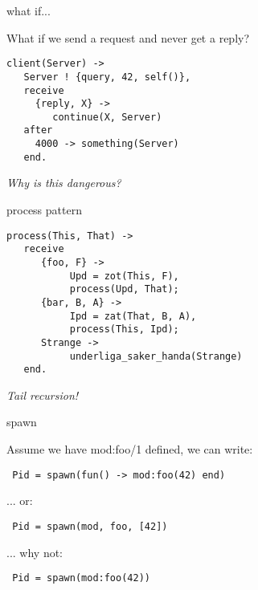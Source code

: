 \begin{frame}[fragile]{what if...}

What if we send a request and never get a reply?

\pause\vspace{20pt}
\begin{verbatim}
client(Server) ->
   Server ! {query, 42, self()},
   receive 
     {reply, X} ->
        continue(X, Server)
   after 
     4000 -> something(Server)
   end.
\end{verbatim}

\pause\vspace{20pt}
{\em Why is this dangerous?}
\end{frame}



\begin{frame}[fragile]{process pattern}

\begin{verbatim}
process(This, That) ->
   receive
      {foo, F} -> 
           Upd = zot(This, F),
           process(Upd, That);
      {bar, B, A} ->
           Ipd = zat(That, B, A),
           process(This, Ipd);
      Strange ->
           underliga_saker_handa(Strange)
   end.
\end{verbatim}

\pause\vspace{20pt}
{\em Tail recursion!}

\end{frame}

\begin{frame}[fragile]{spawn}

Assume we have mod:foo/1 defined, we can write:

\vspace{20pt}
\begin{verbatim}
 Pid = spawn(fun() -> mod:foo(42) end)
\end{verbatim}

\pause
 ... or:
\vspace{10pt}

\begin{verbatim}
 Pid = spawn(mod, foo, [42])
\end{verbatim}

\pause
 ... why not:
\vspace{10pt}
\begin{verbatim}
 Pid = spawn(mod:foo(42))
\end{verbatim}

\end{frame}

